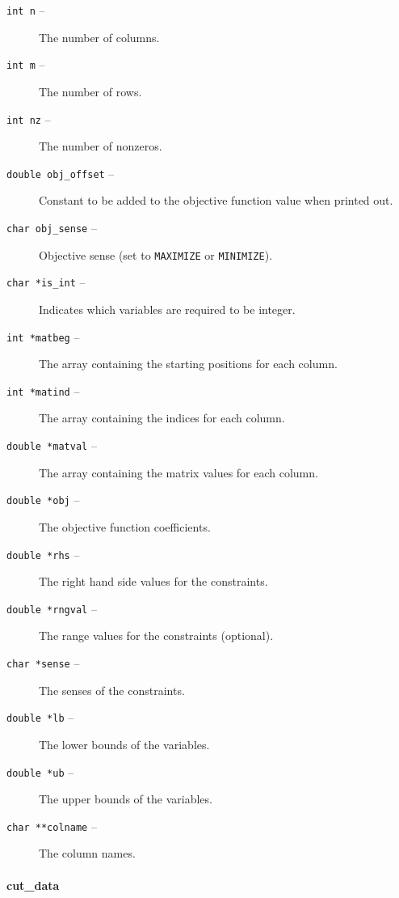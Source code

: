 \begin{description}
\begin{description}
\item [\texttt{int n} --] The number of columns.
\item [\texttt{int m} --] The number of rows.
\item [\texttt{int nz} --] The number of nonzeros.
\item [\texttt{double obj\_offset} --] Constant to be added to the objective
function value when printed out.
\item [\texttt{char obj\_sense} --] Objective sense (set to \texttt{MAXIMIZE}
or \texttt{MINIMIZE}).
\item [\texttt{char *is\_int} --] Indicates which variables are required to be 
integer.
\item [\texttt{int *matbeg} -- ] The array containing the starting positions
for each column.  
\item [\texttt{int *matind} --] The array containing the indices for each
column. 
\item [\texttt{double *matval} --] The array containing the matrix values for
each column.
\item [\texttt{double *obj} --] The objective function coefficients.
\item [\texttt{double *rhs} --] The right hand side values for the
constraints. 
\item [\texttt{double *rngval} --] The range values for the constraints
(optional). 
\item [\texttt{char *sense} --] The senses of the constraints. 
\item [\texttt{double *lb} --] The lower bounds of the variables.
\item [\texttt{double *ub} --] The upper bounds of the variables.
\item [\texttt{char **colname} --] The column names.
\end{description}

\begin{htmlonly}
\paragraph{cut\_data}
\end{htmlonly}
\begin{latexonly}
\end{latexonly}
\label{cut_data}


\end{description}
